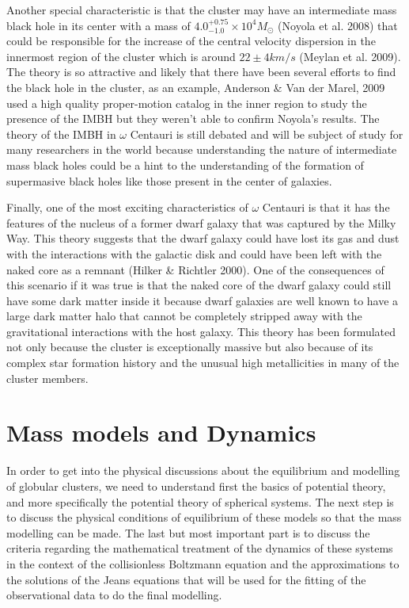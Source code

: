 Another special characteristic is that the cluster may have an intermediate mass black hole in its center with a mass of $4.0^{+0.75}_{-1.0} \times 10^{4} M_{\odot}$ (Noyola et al. 2008) that could be responsible for the increase of the central velocity dispersion in the innermost region of the cluster which is around $22 \pm 4km/s$ (Meylan et al. 2009). The theory is so attractive and likely that there have been several efforts to find the black hole in the cluster, as an example, Anderson \& Van der Marel, 2009 used a high quality proper-motion catalog in the inner region to study the presence of the IMBH but they weren't able to confirm Noyola's results. The theory of the IMBH in $\omega$ Centauri is still debated and will be subject of study for many researchers in the world because understanding the nature of intermediate mass black holes could be a hint to the understanding of the formation of supermasive black holes like those present in the center of galaxies.

Finally, one of the most exciting characteristics of $\omega$ Centauri is that it has the features of the nucleus of a former dwarf galaxy that was captured by the Milky Way. This theory suggests that the dwarf galaxy could have lost its gas and dust with the interactions with the galactic disk and could have been left with the naked core as a remnant (Hilker \& Richtler 2000). One of the consequences of this scenario if it was true is that the naked core of the dwarf galaxy could still have some dark matter inside it because dwarf galaxies are well known to have a large dark matter halo that cannot be completely stripped away with the gravitational interactions with the host galaxy. This theory has been formulated not only because the cluster is exceptionally massive but also because of its complex star formation history and the unusual high metallicities in many of the cluster members.

\section{Mass models and Dynamics}

In order to get into the physical discussions about the equilibrium and modelling of globular clusters, we need to understand first the basics of potential theory, and more specifically the potential theory of spherical systems. The next step is to discuss the physical conditions of equilibrium of these models so that the mass modelling can be made. The last but most important part is to discuss the criteria regarding the mathematical treatment of the dynamics of these systems in the context of the collisionless Boltzmann equation and the approximations to the solutions of the Jeans equations that will be used for the fitting of the observational data to do the final modelling.

